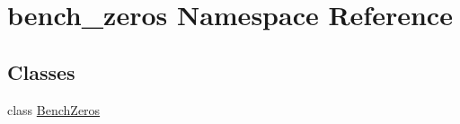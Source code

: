 \hypertarget{namespacebench__zeros}{}\section{bench\+\_\+zeros Namespace Reference}
\label{namespacebench__zeros}
\subsection*{Classes}
\begin{DoxyCompactItemize}
\item 
class \hyperlink{classbench__zeros_1_1BenchZeros}{Bench\+Zeros}
\end{DoxyCompactItemize}
